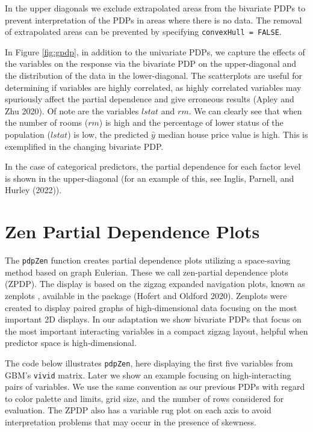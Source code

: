 In the upper diagonals we exclude extrapolated areas from the bivariate PDPs to prevent interpretation of the PDPs in areas where there is no data. The removal of extrapolated areas can be prevented by specifying \texttt{convexHull\ =\ FALSE}.

In Figure \ref{fig:gpdp}, in addition to the univariate PDPs, we capture the effects of the variables on the response via the bivariate PDP on the upper-diagonal and the distribution of the data in the lower-diagonal. The scatterplots are useful for determining if variables are highly correlated, as highly correlated variables may spuriously affect the partial dependence and give erroneous results (Apley and Zhu 2020). Of note are the variables \(lstat\) and \(rm\). We can clearly see that when the number of rooms (\(rm\)) is high and the percentage of lower status of the population (\(lstat\)) is low, the predicted \(\hat{y}\) median house price value is high. This is exemplified in the changing bivariate PDP.

In the case of categorical predictors, the partial dependence for each factor level is shown in the upper-diagonal (for an example of this, see Inglis, Parnell, and Hurley (2022)).

\hypertarget{sec:ZPDP}{%
\section{Zen Partial Dependence Plots}\label{sec:ZPDP}}

The \texttt{pdpZen} function creates partial dependence plots utilizing a space-saving method based on graph Eulerian. These we call zen-partial dependence plots (ZPDP).
The display is based on the zigzag expanded navigation plots, known as zenplots , available in the  package (Hofert and Oldford 2020). Zenplots were created to display paired graphs of high-dimensional data focusing on the most important 2D displays.
In our adaptation we show bivariate PDPs that focus on the most important interacting variables in a compact zigzag layout, helpful when predictor space is high-dimensional.

The code below illustrates \texttt{pdpZen}, here displaying the first five variables from GBM's \texttt{vivid} matrix. Later we show an example focusing on high-interacting pairs of variables.
We use the same convention as our previous PDPs with regard to color palette and limits, grid size, and the number of rows considered for evaluation. The ZPDP also has a variable rug plot on each axis to avoid interpretation problems that may occur in the presence of skewness.

